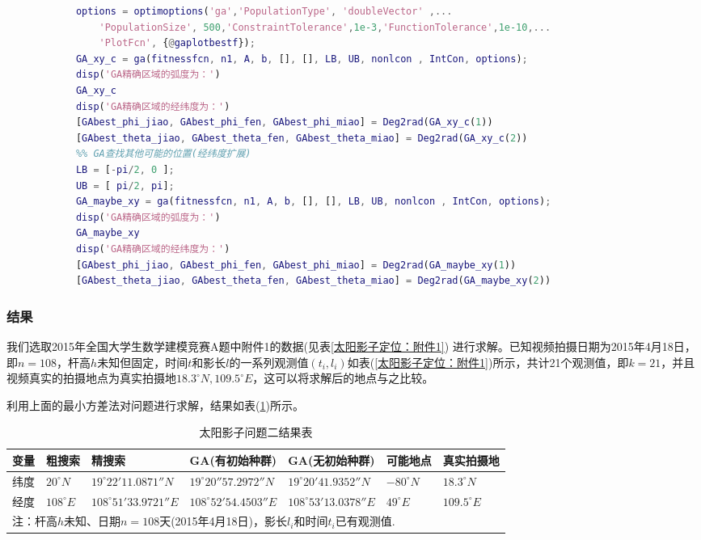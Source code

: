\begin{lstlisting}[language = Matlab]
            %% 不设置初始种群的GA查找
            options = optimoptions('ga','PopulationType', 'doubleVector' ,...
                'PopulationSize', 500,'ConstraintTolerance',1e-3,'FunctionTolerance',1e-10,...
                'PlotFcn', {@gaplotbestf});
            GA_xy_c = ga(fitnessfcn, n1, A, b, [], [], LB, UB, nonlcon , IntCon, options);
            disp('GA精确区域的弧度为：')
            GA_xy_c
            disp('GA精确区域的经纬度为：')
            [GAbest_phi_jiao, GAbest_phi_fen, GAbest_phi_miao] = Deg2rad(GA_xy_c(1))
            [GAbest_theta_jiao, GAbest_theta_fen, GAbest_theta_miao] = Deg2rad(GA_xy_c(2))
            %% GA查找其他可能的位置(经纬度扩展)
            LB = [-pi/2, 0 ];
            UB = [ pi/2, pi];
            GA_maybe_xy = ga(fitnessfcn, n1, A, b, [], [], LB, UB, nonlcon , IntCon, options);
            disp('GA精确区域的弧度为：')
            GA_maybe_xy
            disp('GA精确区域的经纬度为：')
            [GAbest_phi_jiao, GAbest_phi_fen, GAbest_phi_miao] = Deg2rad(GA_maybe_xy(1))
            [GAbest_theta_jiao, GAbest_theta_fen, GAbest_theta_miao] = Deg2rad(GA_maybe_xy(2))
            \end{lstlisting}
        \subsubsection{结果}
            \par
            我们选取2015年全国大学生数学建模竞赛A题中附件1的数据(见表\ref{太阳影子定位：附件1})
            进行求解。已知视频拍摄日期为2015年4月18日，即$n=108$，杆高$h$未知但固定，时间$t$和影长$l$的一系列观测值$(t_i,l_i )$如表(\ref{太阳影子定位：附件1})所示，共计21个观测值，即$k=21$，并且视频真实的拍摄地点为真实拍摄地$18.3^\circ N,109.5^\circ E$，这可以将求解后的地点与之比较。
            \par
            利用上面的最小方差法对问题进行求解，结果如表(\ref{太阳影子问题二结果表})所示。
        \begin{table}[H]
        \small
        \centering
        \caption{太阳影子问题二结果表}
        \label{太阳影子问题二结果表}
        \begin{tabular}{lllllll}
        \toprule
        变量 & 粗搜索 & 精搜索 & GA(有初始种群) & GA(无初始种群)&可能地点 & 真实拍摄地\\
        \midrule
        纬度 & $20^\circ N$ & $19^\circ 22' 11.0871''N$ & $19^\circ 20'' 57.2972''N$ & $19^\circ 20' 41.9352'' N$& $-80^\circ N$ & $18.3^\circ N$\\
        经度 & $108^\circ E$ & $108^\circ 51' 33.9721'' E$ & $108^\circ 52' 54.4503''E$ &  $108^\circ 53' 13.0378''E$& $49^\circ E$ &$109.5^\circ E$\\
        \bottomrule
        \multicolumn{7}{l}{\footnotesize 注：杆高$h$未知、日期$n=108$天(2015年4月18日)，影长$l_i$和时间$t_i$已有观测值.}\\
        \end{tabular}
        \end{table}

